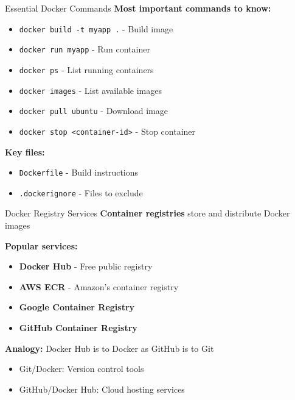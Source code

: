 \documentclass[../main.tex]{subfiles}
\begin{document}
\begin{frame}{Essential Docker Commands}
    \textbf{Most important commands to know:}

    \begin{itemize}
        \item \texttt{docker build -t myapp .} - Build image
        \item \texttt{docker run myapp} - Run container
        \item \texttt{docker ps} - List running containers
        \item \texttt{docker images} - List available images
        \item \texttt{docker pull ubuntu} - Download image
        \item \texttt{docker stop <container-id>} - Stop container
    \end{itemize}

    \bigskip

    \textbf{Key files:}
    \begin{itemize}
        \item \texttt{Dockerfile} - Build instructions
        \item \texttt{.dockerignore} - Files to exclude
    \end{itemize}
\end{frame}

\begin{frame}{Docker Registry Services}
    \textbf{Container registries} store and distribute Docker images

    \bigskip

    \textbf{Popular services:}
    \begin{itemize}
        \item \textbf{Docker Hub} - Free public registry
        \item \textbf{AWS ECR} - Amazon's container registry
        \item \textbf{Google Container Registry}
        \item \textbf{GitHub Container Registry}
    \end{itemize}

    \bigskip

    \textbf{Analogy:} Docker Hub is to Docker as GitHub is to Git
    \begin{itemize}
        \item Git/Docker: Version control tools
        \item GitHub/Docker Hub: Cloud hosting services
    \end{itemize}
\end{frame}
\end{document}
